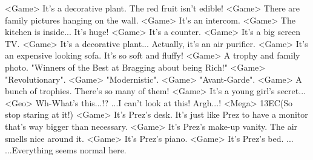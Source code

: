 <Game> It's a decorative plant. 
The red fruit isn't edible! 
<Game> There are family pictures hanging on the wall. 
<Game> It's an intercom. 
<Game> The kitchen is inside... 
It's huge! 
<Game> It's a counter. 
<Game> It's a big screen TV. 
<Game> It's a decorative plant... 
Actually, it's an air purifier. 
<Game> It's an expensive looking sofa. 
It's so soft and fluffy! 
<Game> A trophy and family photo. 
"Winners of the Best at Bragging about being Rich!" 
<Game> "Revolutionary". 
<Game> "Modernistic". 
<Game> "Avant-Garde". 
<Game> A bunch of trophies. 
There's so many of them! 
<Game> It's a young girl's secret... 
<Geo> Wh-What's this...!? 
...I can't look at this! Argh...! 
<Mega> {13}{EC}(So stop staring at it!) 
<Game> It's Prez's desk. 
It's just like Prez to have a monitor that's way bigger than necessary. 
<Game> It's Prez's make-up vanity. 
The air smells nice around it. 
<Game> It's Prez's piano. 
<Game> It's Prez's bed. 
... 
...Everything seems normal here. 

